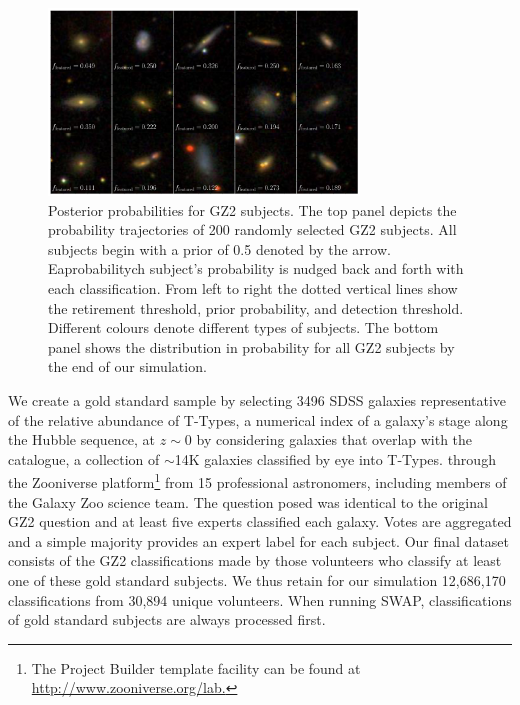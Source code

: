 \documentclass[twocolumn, trackchanges, linenumbers]{aastex6}%
\begin{document}
\begin{figure}[t!] 
\centering
\includegraphics[width=3.25in]{f12.pdf}
\caption{Posterior probabilities for GZ2 subjects.  The top panel depicts the probability trajectories of 200 randomly selected GZ2 subjects. All subjects begin with a prior of 0.5 denoted by the arrow. Eaprobabilitych subject's probability is nudged back and forth with each classification. From left to right the dotted vertical lines show the retirement threshold, prior probability, and detection threshold. Different colours denote different types of subjects. The bottom panel shows the distribution in probability for all GZ2 subjects by the end of our simulation.  \label{fig: subject probabilities}}
\end{figure}

We create a gold standard sample by selecting 3496 SDSS galaxies 
representative of the relative abundance of T-Types, a numerical index of a galaxy's stage along 
the Hubble sequence, at $z\sim0$ by considering galaxies that overlap 
with the~\cite{NairAbraham2010} catalogue, a collection of $\sim$14K galaxies 
classified by eye into T-Types.  through the Zooniverse platform\footnote{The Project Builder template facility can be found at \url{http://www.zooniverse.org/lab.}}  
from 15 professional astronomers, including members of the Galaxy Zoo science team. 
 The question posed was identical to the original GZ2 question and at least five 
experts classified each galaxy. 
Votes are aggregated and a simple majority provides an expert label for each subject. 
Our final dataset consists of the GZ2 classifications made 
by those volunteers who classify at least one of these gold standard subjects. 
We thus retain for our simulation 12,686,170 classifications from 30,894 unique volunteers. 
When running SWAP, classifications of gold standard subjects are always processed first. 
\end{document}
